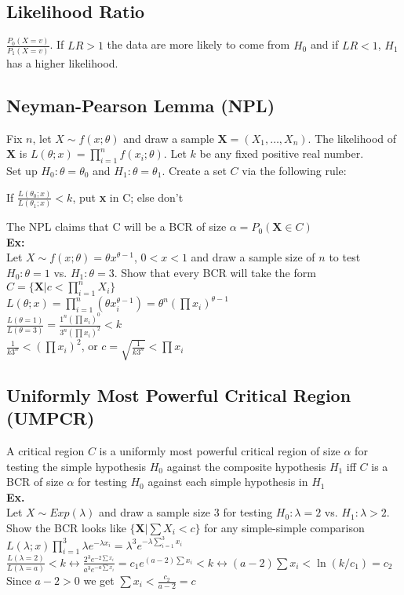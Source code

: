 \documentclass{article}
\begin{document}
\subsection{Likelihood Ratio}
$\frac{P_0(X=v)}{P_1(X=v)}$. If $LR>1$ the data are more likely to come from $H_0$ and if $LR<1$, $H_1$ has a higher likelihood.
\subsection{Neyman-Pearson Lemma (NPL)}
Fix $n$, let $X\sim f(x;\theta)$ and draw a sample $\mathbf{X}=(X_1,\dots,X_n)$. The likelihood of $\mathbf{X}$ is $L(\theta;x)=\prod_{i=1}^nf(x_i;\theta)$. Let $k$ be any fixed positive real number.\\
\newline
Set up $H_0:\theta=\theta_0$ and $H_1:\theta=\theta_1$. Create a set $C$ via the following rule:
\begin{center}
    If $\frac{L(\theta_0;x)}{L(\theta_1;x)}<k$, put \textbf{x} in C; else don't
\end{center}
The NPL claims that C will be a BCR of size $\alpha=P_0(\mathbf{X}\in C)$\\
\textbf{Ex:}\\
Let $X\sim f(x;\theta)=\theta x^{\theta-1}$, $0<x<1$ and draw a sample size of $n$ to test $H_0:\theta=1$ vs. $H_1:\theta=3$. Show that every BCR will take the form $C=\{\mathbf{X}\vert c<\prod_{i=1}^nX_i\}$\\
$L(\theta;x)=\prod_{i=1}^n(\theta x_i^{\theta-1})=\theta^n(\prod x_i)^{\theta-1}$\\
$\frac{L(\theta=1)}{L(\theta=3)}=\frac{1^n(\prod x_i)^0}{3^n(\prod x_i)^2}<k$\\
$\frac{1}{k3^n}<(\prod x_i)^2$, or $c=\sqrt{\frac{1}{k3^n}}<\prod x_i$
\subsection{Uniformly Most Powerful Critical Region (UMPCR)}
A critical region $C$ is a uniformly most powerful critical region of size $\alpha$ for testing the simple hypothesis $H_0$ against the composite hypothesis $H_1$ iff $C$ is a BCR of size $\alpha$ for testing $H_0$ against each simple hypothesis in $H_1$\\
\textbf{Ex.}\\
Let $X\sim Exp(\lambda)$ and draw a sample size $3$ for testing $H_0:\lambda=2$ vs. $H_1:\lambda>2$. Show the BCR looks like $\{\mathbf{X}\vert \sum X_i<c\}$ for any simple-simple comparison\\
$L(\lambda;x)\prod_{i=1}^3\lambda e^{-\lambda x_i}=\lambda^3e^{-\lambda\sum_{i=1}^3 x_i}$\\
$\frac{L(\lambda=2)}{L(\lambda=a)}<k \longleftrightarrow \frac{2^3e^{-2\sum x_i}}{a^3e^{-a\sum x_i}}=c_1e^{(a-2)\sum x_i}<k\longleftrightarrow(a-2)\sum x_i<\ln(k/c_1)=c_2$\\
Since $a-2>0$ we get $\sum x_i<\frac{c_2}{a-2}=c$
\end{document}
